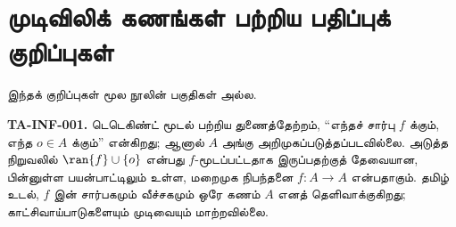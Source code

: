 \section*{முடிவிலிக் கணங்கள் பற்றிய பதிப்புக் குறிப்புகள்}
இந்தக் குறிப்புகள் மூல நூலின் பகுதிகள் அல்ல.

\textbf{TA-INF-001.} டெடெகிண்ட் மூடல் பற்றிய துணைத்தேற்றம்,
``எந்தச் சார்பு $f$ க்கும், எந்த $o\in A$ க்கும்'' என்கிறது;
ஆனால் $A$ அங்கு அறிமுகப்படுத்தப்படவில்லை. அடுத்த நிறுவலில்
$\ran{f}\cup\{o\}$ என்பது $f$-மூடப்பட்டதாக இருப்பதற்குத் தேவையான,
பின்னுள்ள பயன்பாட்டிலும் உள்ள, மறைமுக நிபந்தனை $f:A\to A$ என்பதாகும்.
தமிழ் உடல், $f$ இன் சார்பகமும் வீச்சகமும் ஒரே கணம் $A$ எனத்
தெளிவாக்குகிறது; காட்சிவாய்பாடுகளையும் முடிவையும் மாற்றவில்லை.
